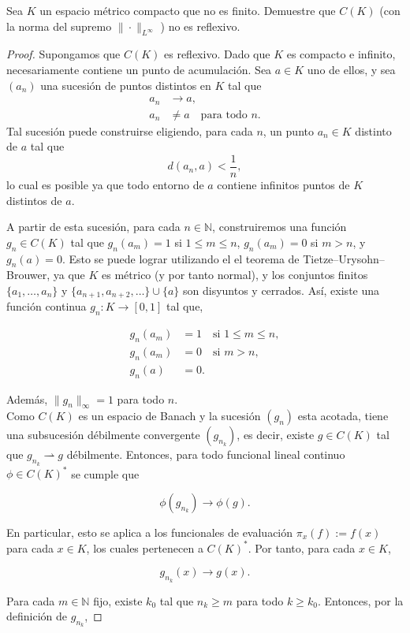  Sea $K$ un espacio métrico compacto que no es finito. Demuestre que $C(K)$ (con la norma del supremo $\|\cdot\|_{L^{\infty}}$ ) no es reflexivo.
 \begin{proof}
Supongamos que \( C(K) \) es reflexivo. Dado que $K$ es compacto e infinito, necesariamente contiene un punto de acumulación. Sea $a \in K$ uno de ellos, y sea $(a_n)$ una sucesión de puntos distintos en $K$ tal que
\begin{align*}
  a_n &\to a, \\
  a_n &\neq a \quad \text{para todo } n.
\end{align*}
Tal sucesión puede construirse eligiendo, para cada $n$, un punto $a_n \in K$ distinto de $a$ tal que
\[
d(a_n, a) < \frac{1}{n},
\]
lo cual es posible ya que todo entorno de $a$ contiene infinitos puntos de $K$ distintos de $a$.


A partir de esta sucesión, para cada $n \in \mathbb{N}$, construiremos una función $g_n \in C(K)$ tal que $g_n(a_m) = 1$ si $1 \leq m \leq n$, $g_n(a_m) = 0$ si $m > n$, y $g_n(a) = 0$. Esto se puede lograr utilizando el el teorema de Tietze–Urysohn–Brouwer, ya que $K$ es métrico (y por tanto normal), y los conjuntos finitos $\{a_1, \dots, a_n\}$ y $\{a_{n+1}, a_{n+2}, \dots\} \cup \{a\}$ son disyuntos y cerrados. Así, existe una función continua $g_n : K \to [0,1]$ tal que,

\begin{align*}
  g_n(a_m) &= 1 \quad \text{si } 1 \leq m \leq n, \\
  g_n(a_m) &= 0 \quad \text{si } m > n, \\
  g_n(a)   &= 0.
\end{align*}

Además, $\|g_n\|_\infty = 1$ para todo $n$. \\
Como \( C(K) \) es un espacio de Banach y la sucesión $(g_n)$ esta acotada, tiene una subsucesión débilmente convergente $(g_{n_k})$, es decir, existe $g \in C(K)$ tal que $g_{n_k} \rightharpoonup g$ débilmente. Entonces, para todo funcional lineal continuo $\phi \in C(K)^*$ se cumple que

\[
\phi(g_{n_k}) \to \phi(g).
\]

En particular, esto se aplica a los funcionales de evaluación $\pi_x(f) := f(x)$ para cada $x \in K$, los cuales pertenecen a $C(K)^*$. Por tanto, para cada $x \in K$,

\[
g_{n_k}(x) \to g(x).
\]

Para cada $m \in \mathbb{N}$ fijo, existe $k_0$ tal que $n_k \geq m$ para todo $k \geq k_0$. Entonces, por la definición de $g_{n_k}$,


\end{proof}
